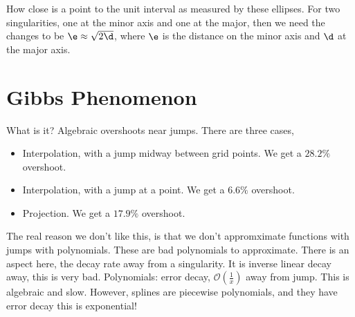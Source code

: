 \noindent
How close is a point to the unit interval as measured by these ellipses. For two singularities, one at the minor axis and one at the major, then we need the changes to be $\e \approx \sqrt{2\d}$, where $\e$ is the distance on the minor axis and $\d$ at the major axis.

\section{Gibbs Phenomenon}
What is it? Algebraic overshoots near jumps. There are three cases,
\begin{itemize}
  \item Interpolation, with a jump midway between grid points. We get a $28.2\%$ overshoot.
  \item Interpolation, with a jump at a point. We get a $6.6\%$ overshoot.
  \item Projection. We get a $17.9\%$ overshoot.
\end{itemize}
The real reason we don't like this, is that we don't appromximate functions with jumps with polynomials. These are bad polynomials to approximate. There is an aspect here, the decay rate away from a singularity. It is inverse linear decay away, this is very bad. Polynomials: error decay, $\mathcal{O}(\frac{1}{x})$ away from jump. This is algebraic and slow. However, splines are piecewise polynomials, and they have error decay this is exponential!